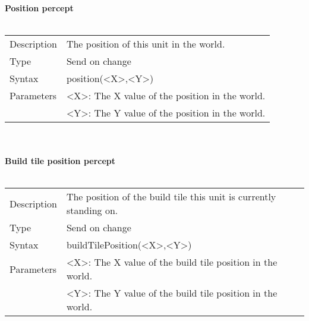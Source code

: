 \documentclass[english,11pt]{report}
\begin{document}
\\
\newpage
\textbf{Position percept}\\
\\
\begin{tabularx}{\textwidth}{lX}
 Description & The position of this unit in the world. \\
 Type & Send on change \\
 Syntax & position(<X>,<Y>) \\
 Parameters &   <X>: The X value of the position in the world.\\
            &   <Y>: The Y value of the position in the world.
\end{tabularx}\\
\\
\textbf{Build tile position percept}\\
\\
\begin{tabularx}{\textwidth}{lX}
 Description & The position of the build tile this unit is currently standing on. \\
 Type & Send on change \\
 Syntax & buildTilePosition(<X>,<Y>) \\
 Parameters &   <X>: The X value of the build tile position in the world.\\
            &   <Y>: The Y value of the build tile position in the world.
\end{tabularx}
\end{document}
